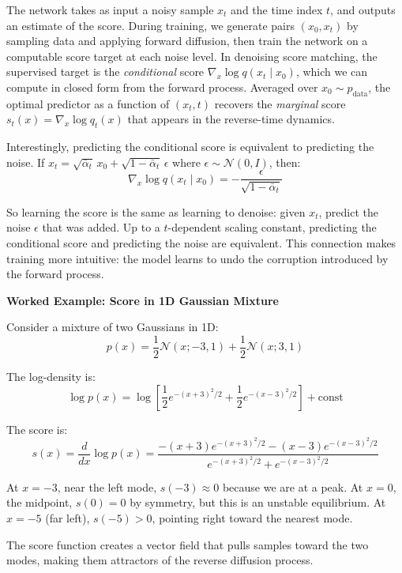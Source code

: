 \vspPara

The network takes as input a noisy sample $x_t$ and the time index $t$, and outputs an estimate of the score. During training, we generate pairs $(x_0, x_t)$ by sampling data and applying forward diffusion, then train the network on a computable score target at each noise level.
In denoising score matching, the supervised target is the \emph{conditional} score $\nabla_x \log q(x_t\mid x_0)$, which we can compute in closed form from the forward process. Averaged over $x_0\sim p_{\text{data}}$, the optimal predictor as a function of $(x_t,t)$ recovers the \emph{marginal} score $s_t(x)=\nabla_x\log q_t(x)$ that appears in the reverse-time dynamics.

\vspPara

Interestingly, predicting the conditional score is equivalent to predicting the noise. If $x_t = \sqrt{\bar{\alpha}_t} \, x_0 + \sqrt{1 - \bar{\alpha}_t} \, \epsilon$ where $\epsilon \sim \mathcal{N}(0,I)$, then:
%
\begin{equation}
\nabla_x \log q(x_t \mid x_0) = -\frac{\epsilon}{\sqrt{1 - \bar{\alpha}_t}}
\end{equation}

\vspPara

So learning the score is the same as learning to denoise: given $x_t$, predict the noise $\epsilon$ that was added. Up to a $t$-dependent scaling constant, predicting the conditional score and predicting the noise are equivalent. This connection makes training more intuitive: the model learns to undo the corruption introduced by the forward process.

\vspSection

\begin{examplebox}
\textbf{Worked Example: Score in 1D Gaussian Mixture}

Consider a mixture of two Gaussians in 1D:
%
\begin{equation*}
p(x) = \frac{1}{2} \mathcal{N}(x; -3, 1) + \frac{1}{2} \mathcal{N}(x; 3, 1)
\end{equation*}

The log-density is:
%
\begin{equation*}
\log p(x) = \log\left[ \frac{1}{2} e^{-(x+3)^2/2} + \frac{1}{2} e^{-(x-3)^2/2} \right] + \text{const}
\end{equation*}

The score is:
%
\begin{equation*}
s(x) = \frac{d}{dx} \log p(x) = \frac{-(x+3) e^{-(x+3)^2/2} - (x-3) e^{-(x-3)^2/2}}{e^{-(x+3)^2/2} + e^{-(x-3)^2/2}}
\end{equation*}

At $x = -3$, near the left mode, $s(-3) \approx 0$ because we are at a peak. At $x = 0$, the midpoint, $s(0) = 0$ by symmetry, but this is an unstable equilibrium. At $x = -5$ (far left), $s(-5) > 0$, pointing right toward the nearest mode.

The score function creates a vector field that pulls samples toward the two modes, making them attractors of the reverse diffusion process.
\end{examplebox}

